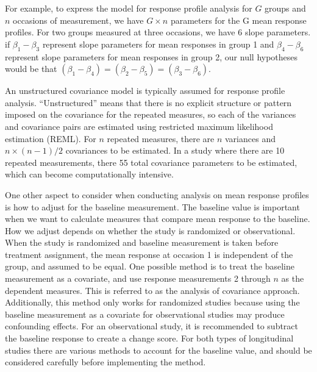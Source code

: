 \documentclass[12pt, twoside]{amherstthesis}
\begin{document}
For example, to express the model for response profile analysis for \(G\) groups and \(n\) occasions of measurement, we have \(G \times n\) parameters for the G mean response profiles. For two groups measured at three occasions, we have 6 slope parameters. if \(\beta_1 - \beta_3\) represent slope parameters for mean responses in group 1 and \(\beta_4 - \beta_6\) represent slope parameters for mean responses in group 2, our null hypotheses would be that \((\beta_1 - \beta_4) = (\beta_2-\beta_5) = (\beta_3-\beta_6)\).

An unstructured covariance model is typically assumed for response profile analysis. ``Unstructured'' means that there is no explicit structure or pattern imposed on the covariance for the repeated measures, so each of the variances and covariance pairs are estimated using restricted maximum likelihood estimation (REML). For \(n\) repeated measures, there are \(n\) variances and \(n \times (n-1)/2\) covariances to be estimated. In a study where there are 10 repeated measurements, there 55 total covariance parameters to be estimated, which can become computationally intensive.

One other aspect to consider when conducting analysis on mean response profiles is how to adjust for the baseline measurement. The baseline value is important when we want to calculate measures that compare mean response to the baseline. How we adjust depends on whether the study is randomized or observational. When the study is randomized and baseline measurement is taken before treatment assignment, the mean response at occasion 1 is independent of the group, and assumed to be equal. One possible method is to treat the baseline measurement as a covariate, and use response measurements 2 through \(n\) as the dependent measures. This is referred to as the analysis of covariance approach. Additionally, this method only works for randomized studies because using the baseline measurement as a covariate for observational studies may produce confounding effects. For an observational study, it is recommended to subtract the baseline response to create a change score. For both types of longitudinal studies there are various methods to account for the baseline value, and should be considered carefully before implementing the method.
\end{document}
